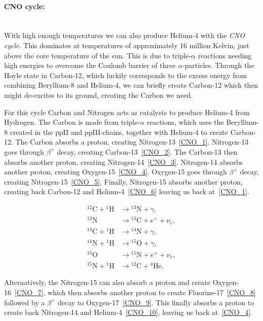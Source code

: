 \documentclass[english, notitlepage]{article}
\begin{document}
\paragraph{CNO cycle:}\mbox{}\\
With high enough temperatures we can also produce Helium-4 with the \textit{CNO cycle}. This dominates at temperatures of approximately 16 million Kelvin, just above the core temperature of the sun. This is due to triple-$α$ reactions needing high energies to overcome the Coulomb barrier of three $α$-particles. Through the Hoyle state in Carbon-12, which luckily corresponds to the excess energy from combining Beryllium-8 and Helium-4, we can briefly create Carbon-12 which then might de-excites to its ground, creating the Carbon we need.  

For this cycle Carbon and Nitrogen acts as catalysts to produce Helium-4 from Hydrogen. The Carbon is made from triple-$α$ reactions, which uses the Beryllium-8 created in the ppII and ppIII-chains, together with Helium-4 to create Carbon-12. The Carbon absorbs a proton, creating Nitrogen-13~\cref{CNO_1}. Nitrogen-13 goes through $\beta^{+}$ decay, creating Carbon-13~\cref{CNO_2}. The Carbon-13 then absorbs another proton, creating Nitrogen-14~\cref{CNO_3}. Nitrogen-14 absorbs another proton, creating Oxygen-15~\cref{CNO_4}. Oxygen-15 goes through $\beta^{+}$ decay, creating Nitrogen-15~\cref{CNO_5}. Finally, Nitrogen-15 absorbs another proton, creating back Carbon-12 and Helium-4~\cref{CNO_6} leaving us back at~\cref{CNO_1}. 

\begin{align}
    {}^{12}\text{C} + {}^{1}\text{H} &→ {}^{13}\text{N} + γ,\label{CNO_1}\\ 
    {}^{13}\text{N} &→ {}^{13}\text{C} + e{}^{+} + \nu_{e},\label{CNO_2} \\
    {}^{13}\text{C} + {}^{1}\text{H} &→ {}^{14}\text{N} + γ,\label{CNO_3} \\
    {}^{14}\text{N} + {}^{1}\text{H} &→ {}^{15}\text{O} + γ,\label{CNO_4} \\
    {}^{15}\text{O} &→ {}^{15}\text{N} + e{}^{+} + \nu_{e},\label{CNO_5} \\
    {}^{15}\text{N} + {}^{1}\text{H} &→ {}^{12}\text{C} + {}^{4}\text{He}. \label{CNO_6}
\end{align}

Alternatively, the Nitrogen-15 can also absorb a proton and create Oxygen-16~\cref{CNO_7}, which then absorbs another proton to create Fluorine-17~\cref{CNO_8} followed by a $\beta^{+}$ decay to Oxygen-17~\cref{CNO_9}. This finally absorbs a proton to create back Nitrogen-14 and Helium-4~\cref{CNO_10}, leaving us back at~\cref{CNO_4}.
\end{document}
